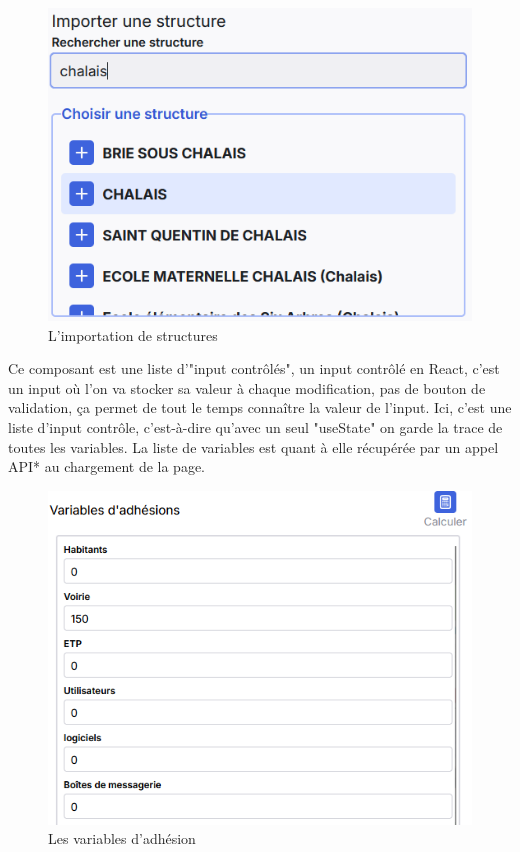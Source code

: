 \documentclass[a4paper,12pt]{report}
\begin{document}
\begin{figure}[H]
    \centering
    \includegraphics[scale=0.6]{import.png}
    \caption{L'importation de structures}
    \label{fig:import-struc}
\end{figure}

Ce composant est une liste d'"input contrôlés", un input contrôlé en React, c'est un input où l'on va stocker sa valeur à chaque modification, pas de bouton de validation, ça permet de tout le temps connaître la valeur de l'input. Ici, c'est une liste d'input contrôle, c'est-à-dire qu'avec un seul "useState" on garde la trace de toutes les variables. La liste de variables est quant à elle récupérée par un appel API* au chargement de la page.

\begin{figure}[H]
    \centering
    \includegraphics[scale=0.6]{adheVar.png}
    \caption{Les variables d'adhésion}
    \label{fig:adhe-var}
\end{figure}
\end{document}
